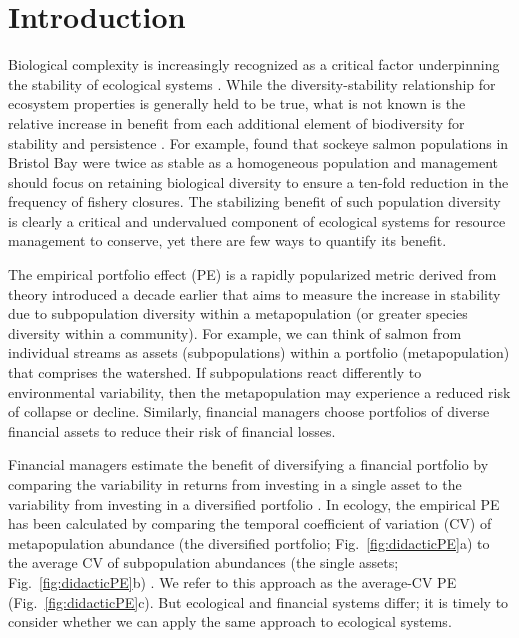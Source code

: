 
\section{Introduction}

Biological complexity is increasingly recognized as a critical factor
underpinning the stability of ecological systems
\citep[e.g.][]{hilborn2003, ives2007, schindler2010}.
While the diversity-stability relationship for ecosystem properties is
generally held to be true, what is not known is the relative increase in
benefit from each additional element of biodiversity for stability and
persistence \citep{cardinale2012}. For example,
\citet{schindler2010} found that sockeye salmon populations in Bristol Bay
were twice as stable as a homogeneous population and management should focus on
retaining biological diversity to ensure a ten-fold reduction in the frequency of
fishery closures. The stabilizing benefit of such population diversity is
clearly a critical and undervalued component of ecological systems for resource
management to conserve, yet there are few ways to quantify its benefit.

The empirical portfolio effect (PE) is a rapidly popularized metric
\citep[e.g.][]{schindler2010, carlson2011, imcc2011} derived from
theory introduced a decade earlier \citep{doak1998, tilman1998,
tilman1999} that aims to measure the increase in stability due to
subpopulation diversity within a metapopulation (or greater species diversity
within a community). For example, we can think of salmon from individual streams
as assets (subpopulations) within a portfolio (metapopulation) that comprises
the watershed. If subpopulations react differently to environmental
variability, then the metapopulation may experience a reduced risk of collapse
or decline. Similarly, financial managers choose portfolios of diverse
financial assets to reduce their risk of financial losses.

Financial managers estimate the benefit of diversifying a
financial portfolio by comparing the variability in returns from investing in a
single asset to the variability from investing in a diversified portfolio
\citep{markowitz1959}. In ecology, the empirical PE has been calculated by
comparing the temporal coefficient of variation (CV) of metapopulation abundance
(the diversified portfolio; Fig.~\ref{fig:didacticPE}a) to the average CV of
subpopulation abundances (the single assets; Fig.~\ref{fig:didacticPE}b)
\citep{secor2009, schindler2010, carlson2011}. We refer to this
approach as the average-CV PE (Fig.~\ref{fig:didacticPE}c). But ecological and
financial systems differ; it is timely to consider whether we can apply the same
approach to ecological systems.

